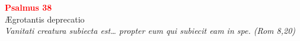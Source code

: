 


\def\greinitialformat#1{%
{\fontsize{39}{39}\selectfont #1}%
}




\vspace{0.3cm}
\begin{center}
 \textcolor{red}{\large \bf Psalmus 38}\\
Ægrotantis deprecatio\\
\textit{\small Vanitati creatura subiecta est… propter eum qui subiecit eam in spe. (Rom 8,20)}
\end{center}
